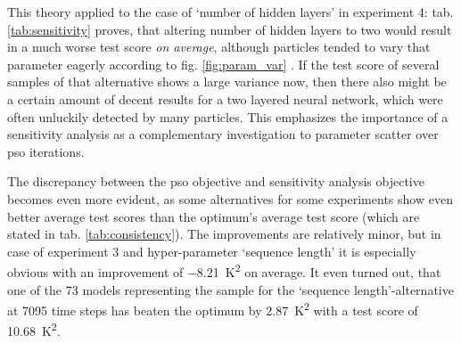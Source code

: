 This theory applied to the case of `number of hidden layers' in experiment 4:
tab. \ref{tab:sensitivity} proves, that altering number of hidden layers to two would result in a much worse test score \textit{on average}, although particles tended to vary that parameter eagerly according to fig. \ref{fig:param_var} .
If the test score of several samples of that alternative shows a large variance now, then there also might be a certain amount of decent results for a two layered neural network, which were often unluckily detected by many particles.
This emphasizes the importance of a sensitivity analysis as a complementary investigation to parameter scatter over \gls{pso} iterations.  

The discrepancy between the \gls{pso} objective and sensitivity analysis objective becomes even more evident, as some alternatives for some experiments show even better average test scores than the optimum's average test score (which are stated in tab. \ref{tab:consistency}).
The improvements are relatively minor, but in case of experiment 3 and hyper-parameter `sequence length' it is especially obvious with an improvement of \SI{-8.21}{\kelvin\squared} on average.
It even turned out, that one of the 73 models representing the sample for the `sequence length'-alternative at 7095 time steps has beaten the optimum by \SI{2.87}{\kelvin\squared} with a test score of \SI{10.68}{\kelvin\squared}.

